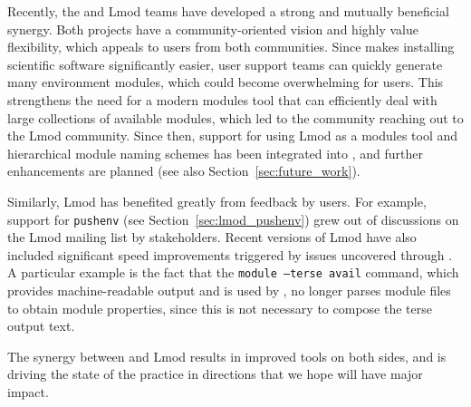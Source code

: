 Recently, the \easybuild{} and Lmod teams have developed
a strong and mutually beneficial synergy. Both projects have a
community-oriented vision and highly value flexibility, which appeals to users
from both communities. Since \easybuild{} makes installing scientific software
significantly easier, user support teams can quickly generate many environment
modules, which could become overwhelming for users. This strengthens the need for a
modern modules tool that can efficiently deal with large collections of available
modules, which led to the \easybuild{} community reaching out to the Lmod community.
Since then, support for using Lmod as a modules tool and  hierarchical
module naming schemes has been integrated into \easybuild{}, and further
enhancements are planned (see also Section~\ref{sec:future_work}).

Similarly, Lmod has benefited greatly from feedback by \easybuild{} users.
For example, support for \texttt{pushenv} (see
Section~\ref{sec:lmod_pushenv}) grew out of discussions on the Lmod
mailing list by \easybuild{} stakeholders. Recent versions of Lmod
have also included significant speed improvements triggered by issues
uncovered through \easybuild{}. A particular example is the fact that
the \texttt{module --terse avail} command, which provides machine-readable output and
is used by \easybuild{}, no longer parses module files to obtain module properties,
since this is not necessary to compose the terse output text.

The synergy between \easybuild{} and Lmod results in improved tools on both sides,
and is driving the state of the practice in directions that we hope will
have major impact.
